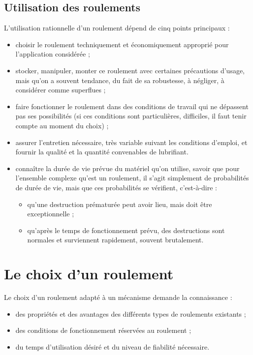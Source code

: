 \subsection{	Utilisation des roulements}

L’utilisation rationnelle d’un roulement dépend de cinq points principaux :

\begin{itemize}
\item  choisir le roulement techniquement et économiquement approprié pour l’application considérée ;
\item  stocker, manipuler, monter ce roulement avec certaines précautions d’usage, mais qu’on a souvent tendance, du fait de sa robustesse, à négliger, à considérer comme superflues ;
\item  faire fonctionner le roulement dans des conditions de travail qui ne dépassent pas ses possibilités (si ces conditions sont particulières, difficiles, il faut tenir compte au moment du choix) ;
\item  assurer l’entretien nécessaire, très variable suivant les conditions d’emploi, et fournir la qualité et la quantité convenables de lubrifiant.
\item  connaître la durée de vie prévue du matériel qu’on utilise, savoir que pour l’ensemble complexe qu’est un roulement, il s’agit simplement de probabilités de durée de vie, mais que ces probabilités se vérifient, c’est-à-dire :


\begin{itemize}
\item  qu’une destruction prématurée peut avoir lieu, mais doit être exceptionnelle ;
\item  qu’après le temps de fonctionnement prévu, des destructions sont normales et surviennent rapidement, souvent brutalement.

\end{itemize}
\end{itemize}



\section{Le	choix d'un roulement}


Le choix d’un roulement adapté à un mécanisme demande la connaissance :

\begin{itemize}
\item  des propriétés et des avantages des différents types de roulements existants ;
\item  des conditions de fonctionnement réservées au roulement ;
\item  du temps d’utilisation désiré et du niveau de fiabilité nécessaire.

\end{itemize}


